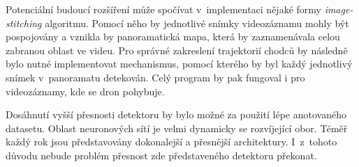 Potenciální budoucí rozšíření může spočívat v~implementaci nějaké formy \textit{image-stitching} algoritmu. Pomocí něho by jednotlivé snímky videozáznamu mohly být pospojovány a vznikla by panoramatická mapa, která by zaznamenávala celou zabranou oblast ve videu. Pro správné zakreslení trajektorií chodců by následně bylo nutné implementovat mechanismus, pomocí kterého by byl každý jednotlivý snímek v~panoramatu detekován. Celý program by pak fungoval i pro videozáznamy, kde se dron pohybuje.

Dosáhnutí vyšší přesnosti detektoru by bylo možné za použití lépe anotovaného datasetu. Oblast neuronových sítí je velmi dynamicky se rozvíjející obor. Téměř každý rok jsou představovány dokonalejší a přesnější architektury. I~z~tohoto důvodu nebude problém přesnost zde představeného detektoru překonat.


